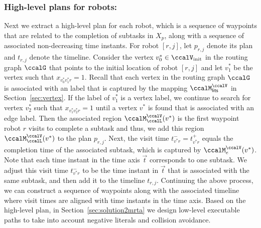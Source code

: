 \documentclass[Afour,sageh,times]{sagej}
\begin{document}
{{{  \subsubsection{High-level plans for robots:} Next we extract a high-level plan for each robot, which is a sequence of waypoints that are related  to  the completion of subtasks in $X_p$, along with a sequence of associated non-decreasing time instants. For robot $[r,j]$, let $p_{r,j}$ denote its plan and $t_{r,j}$ denote the  timeline. Consider the vertex $v^*_0 \in \ccalV_{\text{init}}$ in the routing graph $\ccalG$ that points to the initial location of  robot $[r,j]$  and let $v^*_1$ be the vertex such that $x_{v^*_0 v^*_1 r} =1$. Recall that each vertex in the routing graph $\ccalG$ is associated with an label that is captured by the mapping $\ccalM_{\mathsf{lits}}^{\ccalV}$ in Section~\ref{sec:vertex}. If the label of $v_1^*$ is a vertex label, we continue to search for vertex $v_2^*$ such that $x_{v_1^* v_2^* r}=1$ until a vertex $v^*$ is found that is associated with an edge label. Then the associated region  $\ccalM^\ccalV_{\ccalL}(v^*)$ is the first waypoint robot $r$ visits to complete a subtask and thus, we add this region $\ccalM^\ccalV_{\ccalL}(v^*)$ to the plan $p_{r,j}$. Next, the visit time  $t^-_{v^* r} = t^+_{v^* r}$ equals the completion time of the associated subtask, which is captured by $\ccalM_{e}^{\ccalV}(v^*)$. Note that each time instant in the time axis $\vec{t}$ corresponds to one subtask.  We adjust this visit time $t^-_{v^* r}$ to be the time instant in $\vec{t}$ that is associated with the same subtask, and then add it to the timeline $t_{r,j}$.   Continuing the above process, we can construct a sequence of waypoints along with the associated timeline where visit times are aligned with time instants in the time axis. Based on the high-level plan, in Section~\ref{sec:solution2mrta} we design low-level executable paths to take into account negative literals and collision avoidance.

}}}
\end{document}
